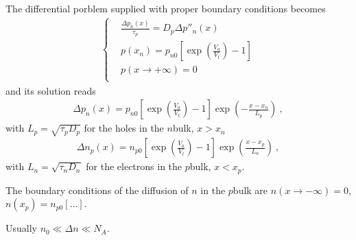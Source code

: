\documentclass[letterpaper,10pt,english]{jupyterBook}
\begin{document}
\sphinxAtStartPar
The differential porblem supplied with proper boundary conditions becomes
\begin{equation*}
\begin{split}\left\{ \begin{aligned}
  & \frac{\Delta p_n(x)}{\tau_p} = D_p \Delta p''_n(x) \\
  & p(x_n) = p_{n0} \left[  \exp\left( \frac{V_a}{V_t} \right) - 1 \right] \\
  & p(x \rightarrow +\infty) = 0 \\
\end{aligned} \right.\end{split}
\end{equation*}
\sphinxAtStartPar
and its solution reads
\begin{equation*}
\begin{split}\Delta p_n(x) = p_{n0} \left[ \exp \left( \frac{V_a}{V_t} \right) - 1 \right] \exp\left( - \frac{x - x_n}{L_p} \right) \ ,\end{split}
\end{equation*}
\sphinxAtStartPar
with \(L_p = \sqrt{ \tau_p D_p }\) for the holes in the \(n\)\sphinxhyphen{}bulk, \(x > x_n\)
\begin{equation*}
\begin{split}\Delta n_p(x) = n_{p0} \left[ \exp \left( \frac{V_a}{V_t} \right) - 1 \right] \exp\left( \frac{x - x_p}{L_n} \right) \ ,\end{split}
\end{equation*}
\sphinxAtStartPar
with \(L_n = \sqrt{ \tau_n D_n }\) for the electrons in the \(p\)\sphinxhyphen{}bulk, \(x < x_p\).%
\begin{footnote}[1]\sphinxAtStartFootnote
The boundary conditions of the diffusion of \(n\) in the \(p\)\sphinxhyphen{}bulk are \(n(x \rightarrow -\infty) = 0\), \(n(x_p) = n_{p0} [ \dots ]\).
%
\end{footnote}%
\begin{footnote}[2]\sphinxAtStartFootnote
Usually \(n_0 \ll \Delta n \ll N_A\).
%
\end{footnote}
\end{document}
